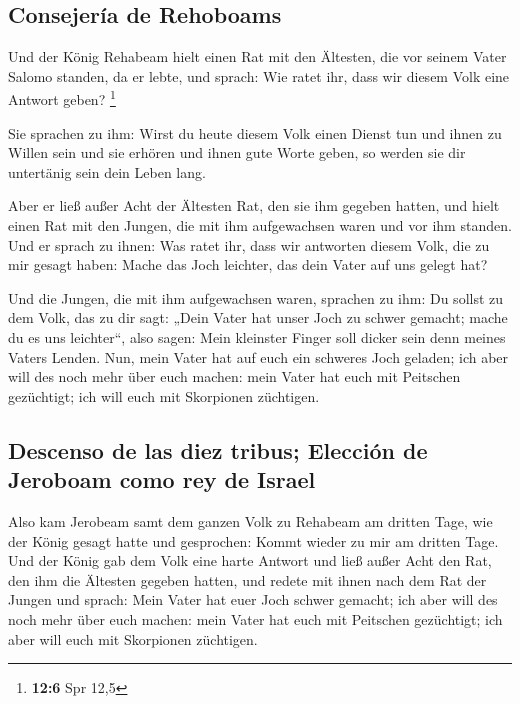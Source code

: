 \hypertarget{consejeruxeda-de-rehoboams}{%
\subsection{Consejería de Rehoboams}\label{consejeruxeda-de-rehoboams}}

 Und der König Rehabeam hielt einen Rat mit den Ältesten,
die vor seinem Vater Salomo standen, da er lebte, und sprach: Wie ratet
ihr, dass wir diesem Volk eine Antwort geben? \footnote{\textbf{12:6}
  Spr 12,5}

 Sie sprachen zu ihm: Wirst du heute diesem Volk einen
Dienst tun und ihnen zu Willen sein und sie erhören und ihnen gute Worte
geben, so werden sie dir untertänig sein dein Leben lang.

 Aber er ließ außer Acht der Ältesten Rat, den sie ihm
gegeben hatten, und hielt einen Rat mit den Jungen, die mit ihm
aufgewachsen waren und vor ihm standen.  Und er sprach zu
ihnen: Was ratet ihr, dass wir antworten diesem Volk, die zu mir gesagt
haben: Mache das Joch leichter, das dein Vater auf uns gelegt hat?

 Und die Jungen, die mit ihm aufgewachsen waren, sprachen
zu ihm: Du sollst zu dem Volk, das zu dir sagt: „Dein Vater hat unser
Joch zu schwer gemacht; mache du es uns leichter``, also sagen: Mein
kleinster Finger soll dicker sein denn meines Vaters Lenden.
 Nun, mein Vater hat auf euch ein schweres Joch geladen;
ich aber will des noch mehr über euch machen: mein Vater hat euch mit
Peitschen gezüchtigt; ich will euch mit Skorpionen züchtigen.

\hypertarget{descenso-de-las-diez-tribus-elecciuxf3n-de-jeroboam-como-rey-de-israel}{%
\subsection{Descenso de las diez tribus; Elección de Jeroboam como rey
de
Israel}\label{descenso-de-las-diez-tribus-elecciuxf3n-de-jeroboam-como-rey-de-israel}}

 Also kam Jerobeam samt dem ganzen Volk zu Rehabeam am
dritten Tage, wie der König gesagt hatte und gesprochen: Kommt wieder zu
mir am dritten Tage.  Und der König gab dem Volk eine
harte Antwort und ließ außer Acht den Rat, den ihm die Ältesten gegeben
hatten,  und redete mit ihnen nach dem Rat der Jungen und
sprach: Mein Vater hat euer Joch schwer gemacht; ich aber will des noch
mehr über euch machen: mein Vater hat euch mit Peitschen gezüchtigt; ich
aber will euch mit Skorpionen züchtigen.


